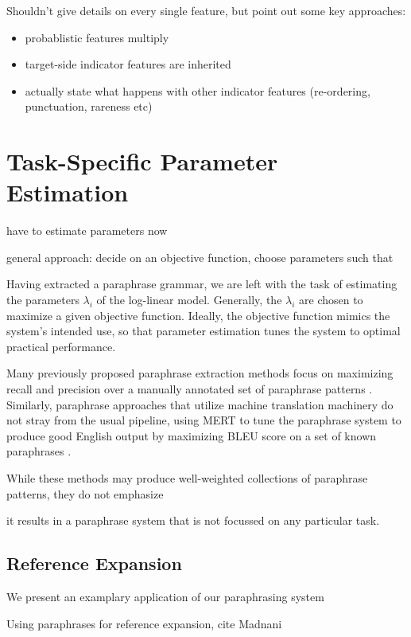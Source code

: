 \documentclass[11pt]{article}
\begin{document}
Shouldn't give details on every single feature, but point out some key
approaches:
\begin{itemize}
\item probablistic features multiply 
\item target-side indicator features are inherited
\item actually state what happens with other indicator features
  (re-ordering, punctuation, rareness etc)
\end{itemize}


\section{Task-Specific Parameter Estimation} 
\label{adaptation}

have to estimate parameters now

general approach: decide on an objective function, choose parameters
such that

Having extracted a paraphrase grammar, we are left with the task of
estimating the parameters $\lambda_i$ of the log-linear
model. Generally, the $\lambda_i$ are chosen to maximize a given
objective function. Ideally, the objective function mimics the
system's intended use, so that parameter estimation tunes the system
to optimal practical performance.

Many previously proposed paraphrase extraction methods focus on
maximizing recall and precision over a manually annotated set of
paraphrase patterns \cite{Zhao2008,Bhagat2008}.  Similarly, paraphrase
approaches that utilize machine translation machinery do not stray
from the usual pipeline, using MERT \cite{Och2003} to tune the
paraphrase system to produce good English output by maximizing BLEU
score on a set of known paraphrases \cite{Madnani2007}.

While these methods may produce well-weighted collections of
paraphrase patterns, they do not emphasize 

it results in a paraphrase system that is not
focussed on any particular task.



\subsection{Reference Expansion}

We present an examplary application of our paraphrasing system

Using paraphrases for reference expansion, cite Madnani
\end{document}
